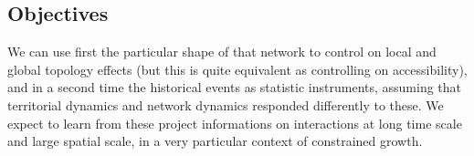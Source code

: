 \subsection{Objectives}

We can use first the particular shape of that network to control on local and global topology effects (but this is quite equivalent as controlling on accessibility), and in a second time the historical events as statistic instruments, assuming that territorial dynamics and network dynamics responded differently to these. We expect to learn from these project informations on interactions at long time scale and large spatial scale, in a very particular context of constrained growth.







